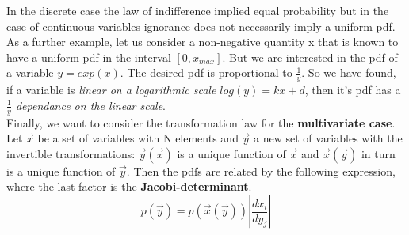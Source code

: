 \documentclass[12pt, a4paper]{scrartcl}
\begin{document}
In the discrete case the law of indiﬀerence implied equal probability but in the
case of continuous variables ignorance does not necessarily imply a uniform pdf.
As a further example, let us consider a non-negative quantity x that is known
to have a uniform pdf in the interval $[0,x_{max}]$. But we are interested in the
pdf of a variable $y=exp(x)$. The desired pdf is proportional
to $\frac{1}{y}$. So we have found, if a variable is \textit{linear on a logarithmic scale $log(y)=kx+d$}, 
then it's pdf has a \textit{$\frac 1y$ dependance on the linear scale}.\\

Finally, we want to consider the transformation law for the \textbf{multivariate case}.
Let $\vec{x}$ be a set of variables with N elements and $\vec{y}$ a new set of variables with the invertible transformations: 
$\vec{y}(\vec{x})$ is a unique function of $\vec{x}$ and $\vec{x}(\vec{y})$ in turn is a unique function of $\vec{y}$. Then the pdfs are related by the following expression, where the last factor is the \textbf{Jacobi-determinant}.\\
\begin{equation*}\boxed{p(\vec{y})=p(\vec{x}(\vec{y}))\left|\frac{dx_i}{dy_j}\right|
}\end{equation*}\\

\\
\end{document}
